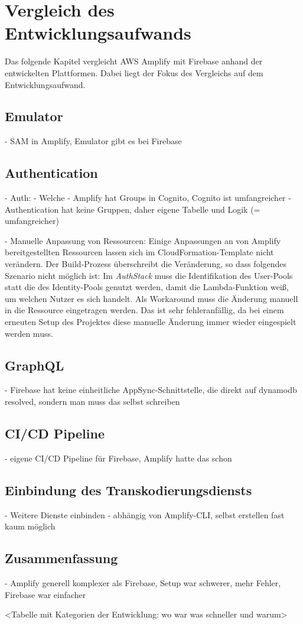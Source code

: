 \chapter{Vergleich des Entwicklungsaufwands}

Das folgende Kapitel vergleicht \ac{AWS} Amplify mit Firebase anhand der entwickelten Plattformen. Dabei liegt der Fokus des Vergleichs auf dem Entwicklungsaufwand.

\section{Emulator}

- SAM in Amplify, Emulator gibt es bei Firebase

\section{Authentication}

- Auth:
  - Welche
  - Amplify hat Groups in Cognito, Cognito ist umfangreicher
  - Authentication hat keine Gruppen, daher eigene Tabelle und Logik (= umfangreicher)

  - Manuelle Anpassung von Ressourcen: Einige Anpassungen an von Amplify bereitgestellten Ressourcen lassen sich im CloudFormation-Template nicht verändern. Der Build-Prozess überschreibt die Veränderung, so dass folgendes Szenario nicht möglich ist: Im \textit{AuthStack} muss die Identifikation des User-Pools statt die des Identity-Pools genutzt werden, damit die Lambda-Funktion weiß, um welchen Nutzer es sich handelt. Als Workaround muss die Änderung manuell in die Ressource eingetragen werden. Das ist sehr fehleranfällig, da bei einem erneuten Setup des Projektes diese manuelle Änderung immer wieder eingespielt werden muss.

\section{GraphQL}

- Firebase hat keine einheitliche AppSync-Schnittstelle, die direkt auf dynamodb resolved, sondern man muss das selbst schreiben

\section{CI/CD Pipeline}

- eigene CI/CD Pipeline für Firebase, Amplify hatte das schon

\section{Einbindung des Transkodierungsdiensts}

- Weitere Dienste einbinden
- abhängig von Amplify-CLI, selbst erstellen fast kaum möglich

\section{Zusammenfassung}

- Amplify generell komplexer als Firebase, Setup war schwerer, mehr Fehler, Firebase war einfacher

<Tabelle mit Kategorien der Entwicklung: wo war was schneller und warum>